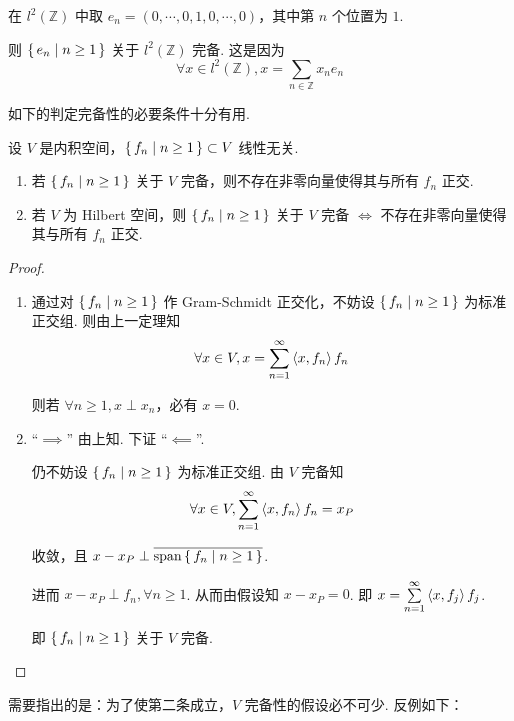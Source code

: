 \begin{example}
    在 $l^2(\mathbb{Z})$ 中取 $e_n=(0,\cdots,0,1,0,\cdots,0)$，其中第 $n$ 个位置为 $1$.

    则 $\set{e_n|n\ge 1}$ 关于 $l^2(\mathbb{Z})$ 完备. 这是因为
$$
\forall x\in l^2(\mathbb{Z}),x=\sum_{n\in\mathbb{Z}}x_ne_n
$$
\end{example}

如下的判定完备性的必要条件十分有用.

\begin{property}
    设 $V$ 是内积空间，$\set{f_n|n\ge 1}\subset V$ 线性无关.

    \begin{enumerate}
        \item 若 $\set{f_n|n\ge 1}$ 关于 $V$ 完备，则不存在非零向量使得其与所有 $f_n$ 正交.
        
        \item 若 $V$ 为 Hilbert 空间，则 $\set{f_n|n\ge 1}$ 关于 $V$ 完备 $\iff$ 不存在非零向量使得其与所有 $f_n$ 正交.
    \end{enumerate}
\end{property}
\begin{proof}
    \begin{enumerate}
        \item 通过对 $\set{f_n|n\ge 1}$ 作 Gram-Schmidt 正交化，不妨设 $\set{f_n|n\ge 1}$ 为标准正交组. 则由上一定理知
$$
\forall x\in V,x=\sum_{n=1}^\infty\left\langle{x,f_n}\right\rangle f_n
$$

        则若 $\forall n\ge 1,x\perp x_n$，必有 $x=0$.

        \item “$\implies$” 由上知. 下证 “$\impliedby$”.
        
        仍不妨设 $\set{f_n|n\ge 1}$ 为标准正交组. 由 $V$ 完备知
$$
\forall x\in V,\sum_{n=1}^\infty\left\langle{x,f_n}\right\rangle f_n=x_P
$$

        收敛，且 $x-x_P\perp\overline{\mathrm{span}\set{f_n|n\ge 1}}$.

        进而 $x-x_P\perp f_n,\forall n\ge 1$. 从而由假设知 $x-x_P=0$. 即 $x=\sum\limits_{n=1}^\infty\left\langle{x,f_j}\right\rangle f_j$.

        即 $\set{f_n|n\ge 1}$ 关于 $V$ 完备.
    \end{enumerate}
\end{proof}

\begin{hint}
    需要指出的是：为了使第二条成立，$V$ 完备性的假设必不可少. 反例如下：
\end{hint}

